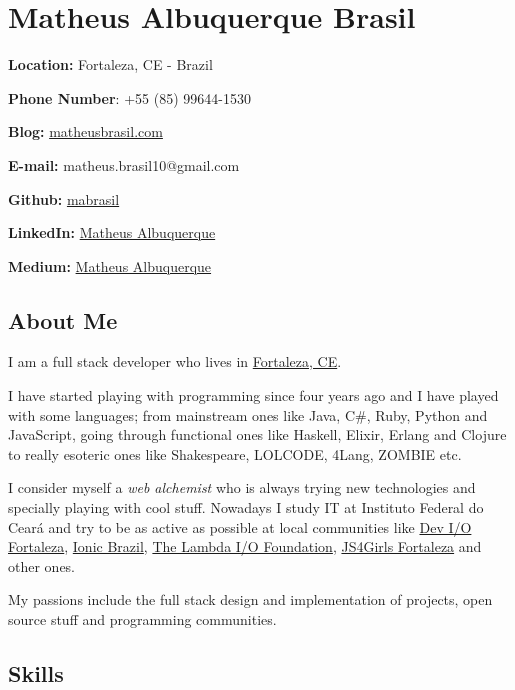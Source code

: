 \documentclass[]{article}
\date{}
\begin{document}
\section{Matheus Albuquerque Brasil}\label{matheus-albuquerque-brasil}

\textbf{Location:} Fortaleza, CE - Brazil

\textbf{Phone Number}: +55 (85) 99644-1530

\textbf{Blog:} \href{http://matheusbrasil.com}{matheusbrasil.com}

\textbf{E-mail:} matheus.brasil10@gmail.com

\textbf{Github:} \href{https://github.com/mabrasil}{mabrasil}

\textbf{LinkedIn:}
\href{https://www.linkedin.com/in/matheusalbuquerque}{Matheus
Albuquerque}

\textbf{Medium:} \href{https://medium.com/@matheusalbuquerque}{Matheus
Albuquerque}

\subsection{About Me}\label{about-me}

I am a full stack developer who lives in
\href{http://pt.wikipedia.org/wiki/Fortaleza}{Fortaleza, CE}.

I have started playing with programming since four years ago and I have
played with some languages; from mainstream ones like Java, C\#, Ruby,
Python and JavaScript, going through functional ones like Haskell,
Elixir, Erlang and Clojure to really esoteric ones like Shakespeare,
LOLCODE, 4Lang, ZOMBIE etc.

I consider myself a \emph{web alchemist} who is always trying new
technologies and specially playing with cool stuff. Nowadays I study IT
at Instituto Federal do Ceará and try to be as active as possible at
local communities like
\href{https://www.facebook.com/groups/fortalezadevelopers/}{Dev I/O
Fortaleza}, \href{http://ionicbrazil.com/}{Ionic Brazil},
\href{https://github.com/lambda-io}{The Lambda I/O Foundation},
\href{http://js4girls-fortaleza.github.io/}{JS4Girls Fortaleza} and
other ones.

My passions include the full stack design and implementation of
projects, open source stuff and programming communities.

\subsection{Skills}\label{skills}
\end{document}
